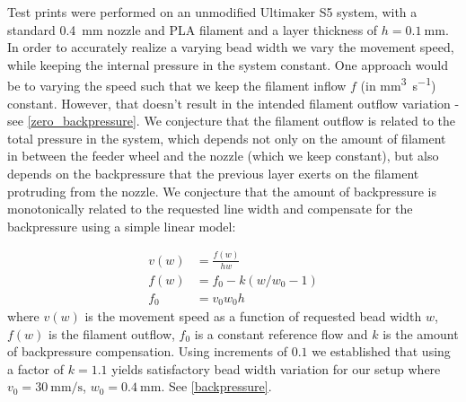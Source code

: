Test prints were performed on an unmodified Ultimaker S5 system,
with a standard  \SI{0.4}{\milli\meter} nozzle
and PLA filament
and a layer thickness of $h=\SI{0.1}{\milli\meter}$.
In order to accurately realize a varying bead width we vary the movement speed, while keeping the internal pressure in the system constant.
One approach would be to varying the speed such that we keep the filament inflow $f$ (in \si{\milli\meter\cubed\per\second}) constant.
However, that doesn't result in the intended filament outflow variation - see \cref{zero_backpressure}.
We conjecture that the filament outflow is related to the total pressure in the system,
which depends not only on the amount of filament in between the feeder wheel and the nozzle (which we keep constant), 
but also depends on the backpressure that the previous layer exerts on the filament protruding from the nozzle.
We conjecture that the amount of backpressure is monotonically related to the requested line width and compensate for the backpressure using a simple linear model:

\begin{align}
 v(w) &= \frac{f(w)}{h w} \\ 
 f(w) &= f_0 - k \left( w / w_0 - 1 \right) \\
 f_0 &= v_0 w_0 h 
\end{align}
where
$v(w)$ is the movement speed as a function of requested bead width $w$,
$f(w)$ is the filament outflow,
$f_0$ is a constant reference flow
and
$k$ is the amount of backpressure compensation.
Using increments of $0.1$ we established that using a factor of $k=1.1$ yields satisfactory bead width variation for our setup where
$v_0=\SI{30}{\milli\meter\per\second}$, 
$w_0=\SI{0.4}{\milli\meter}$.
See \cref{backpressure}.


